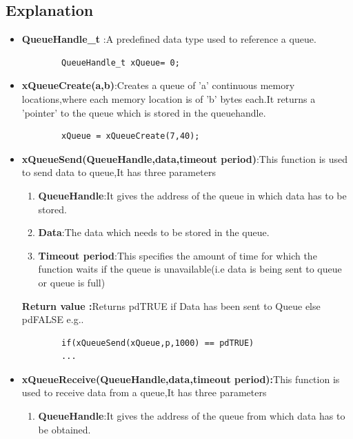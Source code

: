 \documentclass[11pt,a4paper]{book}
\begin{document}
	\subsection{Explanation}
	\begin{itemize}
		\item \textbf{QueueHandle\_t} :A predefined data type used to reference a queue.
		
		\begin{lstlisting}
		QueueHandle_t xQueue= 0;
		\end{lstlisting}	
		
		\item \textbf{xQueueCreate(a,b)}:Creates a queue of 'a' continuous memory locations,where each memory location is of 'b' bytes each.It returns a 'pointer' to the queue which is stored in the queuehandle.
		
		\begin{lstlisting}
		xQueue = xQueueCreate(7,40);
		\end{lstlisting}
		
		\item \textbf{xQueueSend(QueueHandle,data,timeout period)}:This function is used to send data to queue,It has three parameters
		
		\begin{enumerate}
			\item\textbf{QueueHandle}:It gives the address of the queue in which data has to be stored.
			
			\item\textbf{Data}:The data which needs to be stored in the queue.
			
			\item\textbf{Timeout period}:This specifies the amount of time for which the function waits if the queue is unavailable(i.e data is being sent to queue or queue is full) 
			\newline		
		\end{enumerate}
		
		\textbf{Return value :}Returns pdTRUE if Data has been sent to Queue else pdFALSE e.g..
		\begin{lstlisting}
		if(xQueueSend(xQueue,p,1000) == pdTRUE)
		...
		\end{lstlisting}
	\item \textbf{xQueueReceive(QueueHandle,data,timeout period):}This function is used to receive data from a queue,It has three parameters
	
	\begin{enumerate}
		\item\textbf{QueueHandle}:It gives the address of the queue from which data has to be obtained.
		

\end{enumerate}
\end{itemize}
\end{document}
